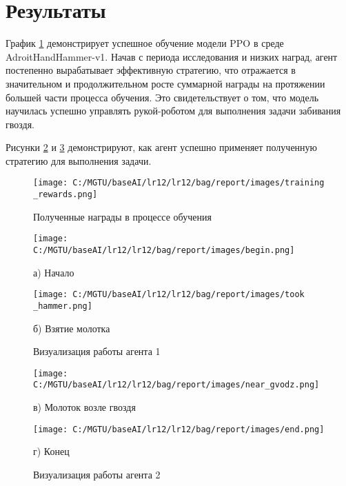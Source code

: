 \section{Результаты}

График \ref{fig:training_rewards} демонстрирует успешное обучение модели PPO в среде AdroitHandHammer-v1. 
Начав с периода исследования и низких наград, агент постепенно вырабатывает эффективную стратегию, 
что отражается в значительном и продолжительном росте суммарной награды на протяжении большей части процесса обучения. 
Это свидетельствует о том, что модель научилась успешно управлять рукой-роботом для выполнения задачи забивания гвоздя.

Рисунки \ref{fig:work1} и \ref{fig:work2} демонстрируют, как агент успешно применяет полученную стратегию для выполнения задачи.

\begin{figure}[H]
    \centering
    \texttt{[image: C:/MGTU/baseAI/lr12/lr12/bag/report/images/training\\\_rewards.png]}
    \caption{Полученные награды в процессе обучения}
    \label{fig:training_rewards}
\end{figure}

\begin{figure}[H]
    \centering
    \begin{minipage}[H]{0.49\linewidth}
        \centering
        \texttt{[image: C:/MGTU/baseAI/lr12/lr12/bag/report/images/begin.png]}
        \caption*{а) Начало}
    \end{minipage}
    \hfill
    \begin{minipage}[H]{0.48\linewidth}
        \centering
        \texttt{[image: C:/MGTU/baseAI/lr12/lr12/bag/report/images/took\\\_hammer.png]}
        \caption*{б) Взятие молотка}
    \end{minipage}
    \caption{Визуализация работы агента 1}
    \label{fig:work1}
\end{figure}

\begin{figure}[H]
    \centering
    \begin{minipage}[H]{0.48\linewidth}
      \centering
      \texttt{[image: C:/MGTU/baseAI/lr12/lr12/bag/report/images/near\_gvodz.png]}
      \caption*{в) Молоток возле гвоздя}
    \end{minipage}
    \hfill
    \begin{minipage}[H]{0.48\linewidth}
      \centering
      \texttt{[image: C:/MGTU/baseAI/lr12/lr12/bag/report/images/end.png]}
      \caption*{г) Конец}
    \end{minipage}
    \caption{Визуализация работы агента 2}
    \label{fig:work2}
  \end{figure}

